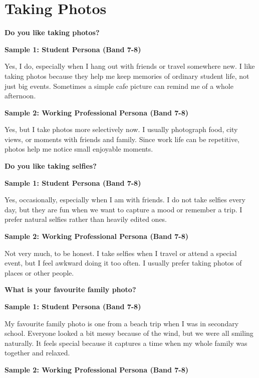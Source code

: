 \newpage

\section{Taking Photos}
\begin{ieltsquestion}
\textbf{Do you like taking photos?}
\end{ieltsquestion}
\textbf{Sample 1: Student Persona (Band 7-8)}

Yes, I do, especially when I hang out with friends or travel somewhere new. I like taking photos because they help me keep memories of ordinary student life, not just big events. Sometimes a simple cafe picture can remind me of a whole afternoon.

\textbf{Sample 2: Working Professional Persona (Band 7-8)}

Yes, but I take photos more selectively now. I usually photograph food, city views, or moments with friends and family. Since work life can be repetitive, photos help me notice small enjoyable moments.

\separator

\begin{ieltsquestion}
\textbf{Do you like taking selfies?}
\end{ieltsquestion}
\textbf{Sample 1: Student Persona (Band 7-8)}

Yes, occasionally, especially when I am with friends. I do not take selfies every day, but they are fun when we want to capture a mood or remember a trip. I prefer natural selfies rather than heavily edited ones.

\textbf{Sample 2: Working Professional Persona (Band 7-8)}

Not very much, to be honest. I take selfies when I travel or attend a special event, but I feel awkward doing it too often. I usually prefer taking photos of places or other people.

\separator

\begin{ieltsquestion}
\textbf{What is your favourite family photo?}
\end{ieltsquestion}
\textbf{Sample 1: Student Persona (Band 7-8)}

My favourite family photo is one from a beach trip when I was in secondary school. Everyone looked a bit messy because of the wind, but we were all smiling naturally. It feels special because it captures a time when my whole family was together and relaxed.

\textbf{Sample 2: Working Professional Persona (Band 7-8)}

